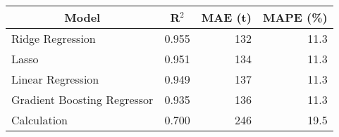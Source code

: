 
\begin{tabular}[t]{lrrr}
\toprule
\multicolumn{1}{c}{Model} & \multicolumn{1}{c}{R$^2$} & \multicolumn{1}{c}{MAE (t)} & \multicolumn{1}{c}{MAPE (\%)}\\
\midrule
Ridge Regression & 0.955 & 132 & 11.3\\
Lasso & 0.951 & 134 & 11.3\\
Linear Regression & 0.949 & 137 & 11.3\\
Gradient Boosting Regressor & 0.935 & 136 & 11.3\\
Calculation & 0.700 & 246 & 19.5\\
\bottomrule
\end{tabular}
